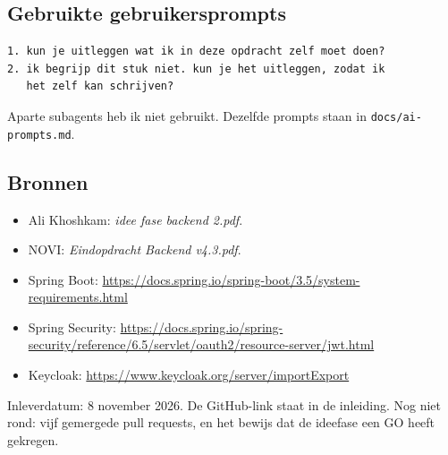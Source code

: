 \documentclass[11pt]{article}
\begin{document}
\subsection{Gebruikte gebruikersprompts}
\begin{lstlisting}
1. kun je uitleggen wat ik in deze opdracht zelf moet doen?
2. ik begrijp dit stuk niet. kun je het uitleggen, zodat ik
   het zelf kan schrijven?
\end{lstlisting}
Aparte subagents heb ik niet gebruikt. Dezelfde prompts staan in
\texttt{docs/ai-prompts.md}.

\subsection{Bronnen}
\begin{itemize}
  \item Ali Khoshkam: \emph{idee fase backend 2.pdf}.
  \item NOVI: \emph{Eindopdracht Backend v4.3.pdf}.
  \item Spring Boot: \url{https://docs.spring.io/spring-boot/3.5/system-requirements.html}
  \item Spring Security: \url{https://docs.spring.io/spring-security/reference/6.5/servlet/oauth2/resource-server/jwt.html}
  \item Keycloak: \url{https://www.keycloak.org/server/importExport}
\end{itemize}

Inleverdatum: 8 november 2026. De GitHub-link staat in de inleiding. Nog niet
rond: vijf gemergede pull requests, en het bewijs dat de ideefase een GO heeft
gekregen.
\end{document}
